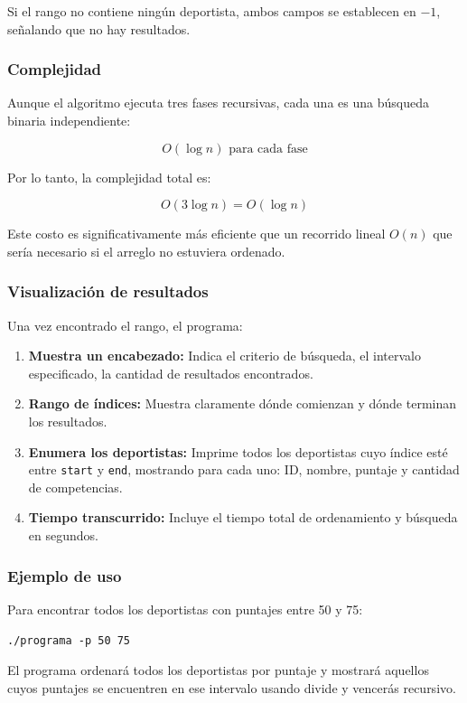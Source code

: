 Si el rango no contiene ningún deportista, ambos campos se establecen en $-1$, señalando que no hay resultados.

\subsubsection{Complejidad}

Aunque el algoritmo ejecuta tres fases recursivas, cada una es una búsqueda binaria independiente:

\[
O(\log n) \text{ para cada fase}
\]

Por lo tanto, la complejidad total es:

\[
O(3 \log n) = O(\log n)
\]

Este costo es significativamente más eficiente que un recorrido lineal \(O(n)\) que sería necesario si el arreglo no estuviera ordenado.

\subsubsection{Visualización de resultados}

Una vez encontrado el rango, el programa:

\begin{enumerate}
    \item \textbf{Muestra un encabezado:} Indica el criterio de búsqueda, el intervalo especificado, la cantidad de resultados encontrados.
    
    \item \textbf{Rango de índices:} Muestra claramente dónde comienzan y dónde terminan los resultados.
    
    \item \textbf{Enumera los deportistas:} Imprime todos los deportistas cuyo índice esté entre \texttt{start} y \texttt{end}, mostrando para cada uno: ID, nombre, puntaje y cantidad de competencias.
    
    \item \textbf{Tiempo transcurrido:} Incluye el tiempo total de ordenamiento y búsqueda en segundos.
\end{enumerate}

\subsubsection{Ejemplo de uso}

Para encontrar todos los deportistas con puntajes entre 50 y 75:

\texttt{./programa -p 50 75}

El programa ordenará todos los deportistas por puntaje y mostrará aquellos cuyos puntajes se encuentren en ese intervalo usando divide y vencerás recursivo.

